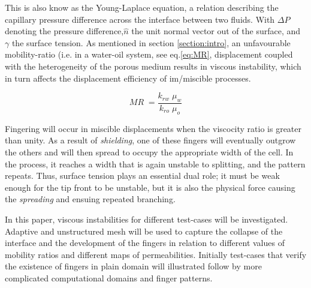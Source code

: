 \documentclass[preprint,authoryear,12pt]{elsarticle}
\begin{document}
\noindent This is also know as the Young-Laplace equation, a relation describing the capillary pressure difference across the interface between two fluids. With $\Delta P$ denoting the pressure difference,$\hat{n}$ the unit normal vector out of the surface, and $\gamma$ the surface tension. As mentioned in section \ref{section:intro}, an unfavourable mobility-ratio (i.e. in a water-oil system, see eq.\ref{eq:MR}, displacement coupled with the heterogeneity of the porous medium results in viscous instability, which in turn affects the displacement efficiency of im/miscible processes. 

\begin{equation}
 MR \; = \frac{k_{rw} \; \mu_{w}}{k_{ro} \; \mu_{o}} 
\label{eq:MR}
\end{equation}

\noindent Fingering will occur in miscible displacements when the viscocity ratio is greater than unity. %
As a result of \textit{shielding}, one of these fingers will eventually outgrow the others and will then spread to occupy the appropriate width of the cell. In the process, it reaches a width that is again unstable to splitting, and the pattern repeats. Thus, surface tension plays an essential dual role; it must be weak enough for the tip front to be unstable, but it is also the physical force causing the \textit{spreading} and ensuing repeated branching.

In  this paper, viscous instabilities for different test-cases will be investigated. Adaptive and unstructured mesh will be used to capture the collapse of the interface and the development of the fingers in relation to different values of mobility ratios and different maps of permeabilities. Initially test-cases that verify the existence of fingers in plain domain will illustrated follow by more complicated computational domains and finger patterns.  
\end{document}
